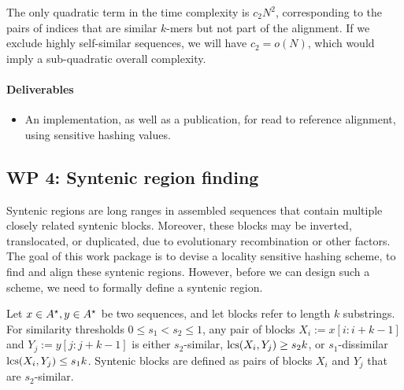 The only quadratic term in the time complexity is $c_2 N^2$, corresponding to the pairs of indices that are similar $k$-mers but not part of the alignment. If we exclude highly self-similar sequences, we will have $c_2 = o(N)$, which would imply a sub-quadratic overall complexity.   



\paragraph{Deliverables}
\begin{itemize}
\item An implementation, as well as a publication, for read to reference alignment, using sensitive hashing values.
\end{itemize}


\subsection{WP 4: Syntenic region finding}
Syntenic regions are long ranges in assembled sequences that contain multiple closely related syntenic blocks. Moreover, these blocks may be inverted, translocated, or duplicated, due to evolutionary recombination or other factors. The goal of this work package is to devise a locality sensitive hashing scheme, to find and align these syntenic regions. However, before we can design such a scheme, we need to formally define a syntenic region. 


Let $x\in A^\star, y\in A^\star$ be two sequences, and let blocks refer to length $k$ substrings. For similarity thresholds $0\le s_1 < s_2\le 1$, any pair of blocks $X_i:=x[i:i+k-1]$ and $Y_j:=y[j:j+k-1]$ is either $s_2$-similar, $\operatorname{\mathrm{lcs}}(X_i,Y_j)\ge s_2 k$, or $s_1$-dissimilar $\operatorname{\mathrm{lcs}}(X_i,Y_j)\le s_1 k$. Syntenic blocks are defined as pairs of blocks $X_i$ and $Y_j$ that are $s_2$-similar. 


